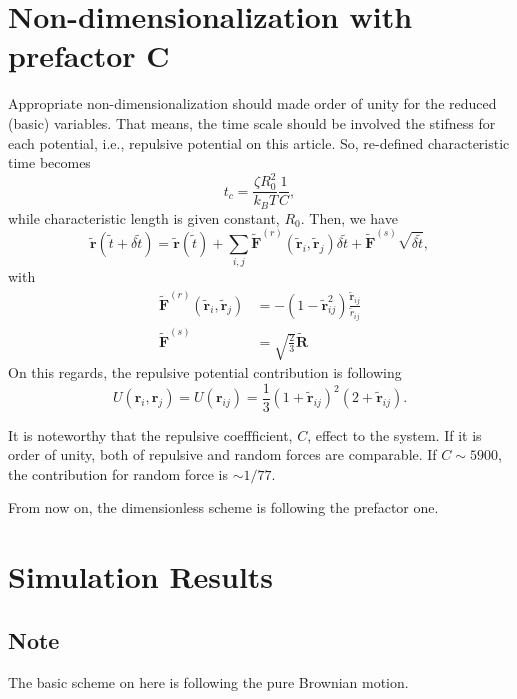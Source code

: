 \message{ !name(brief_Brownian_dynamics.tex)}\documentclass[10pt, a4paper]{report}
\begin{document}
\section{Non-dimensionalization with prefactor C}
Appropriate non-dimensionalization should made order of unity for the reduced (basic) variables. That means, the time scale should be involved the stifness for each potential, i.e., repulsive potential on this article. So, re-defined characteristic time becomes
\begin{equation}
t_c = \frac{\zeta R_0^2}{k_BT}\frac{1}{C},\label{eq:characteristic_time_C}
\end{equation}
while characteristic length is given constant, $R_0$.
Then, we have
\begin{equation}
\tilde{\mathbf{r}}(\tilde{t} + \delta \tilde{t}) = \tilde{\mathbf{r}}(\tilde{t}) + \sum_{i,j}\tilde{\mathbf{F}}^{(r)}(\tilde{\mathbf{r}}_i, \tilde{\mathbf{r}}_j)\delta \tilde{t} + \tilde{\mathbf{F}}^{(s)}\sqrt{\delta\tilde{t}},
\end{equation}
with
\begin{align}
\tilde{\mathbf{F}}^{(r)}(\tilde{\mathbf{r}}_i, \tilde{\mathbf{r}}_j) &= -\left(1-\tilde{\mathbf{r}}_{ij}^2\right)\frac{\tilde{\mathbf{r}}_{ij}}{\tilde{r}_{ij}}\\
\tilde{\mathbf{F}}^{(s)} &= \sqrt{\frac{2}{3}}\tilde{\mathbf{R}}
\end{align}
On this regards, the repulsive potential contribution is following
\begin{equation}
U(\mathbf{r}_i, \mathbf{r}_j) = U(\mathbf{r}_{ij}) = \frac{1}{3}\left(1 + \tilde{\mathbf{r}}_{ij}\right)^2(2 + \tilde{\mathbf{r}}_{ij}).
\end{equation}

It is noteworthy that the repulsive coeffficient, $C$, effect to the system. If it is order of unity, both of repulsive and random forces are comparable. If $C\sim 5900$, the contribution for random force is $\sim 1/77$.

From now on, the dimensionless scheme is following the prefactor one.

\section{Simulation Results}
\subsection{Note}
The basic scheme on here is following the pure Brownian motion. 
\end{document}
